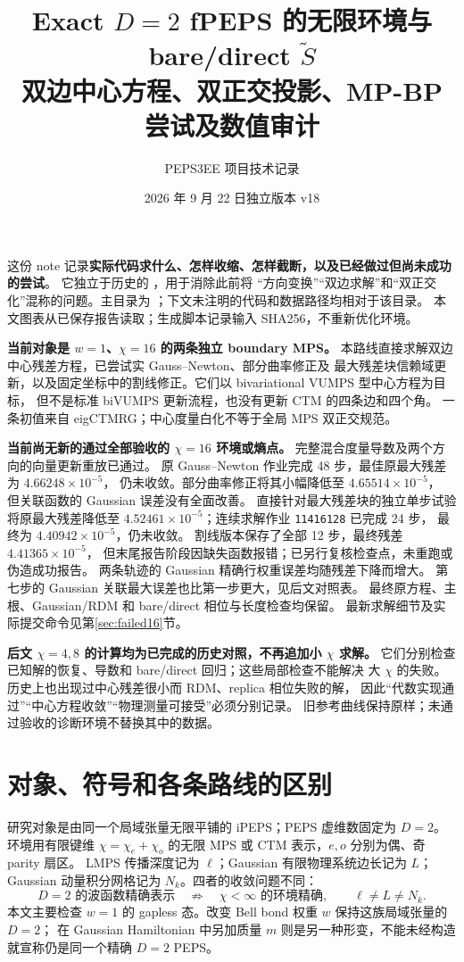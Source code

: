 \documentclass[11pt]{article}
\title{Exact $D=2$ fPEPS 的无限环境与 bare/direct $\widetilde S$\\
\large 双边中心方程、双正交投影、MP-BP 尝试及数值审计}
\author{PEPS3EE 项目技术记录}
\date{2026 年 9 月 22 日\quad 独立版本 v18}
\begin{document}
\maketitle

这份 note 记录\textbf{实际代码求什么、怎样收缩、怎样截断，以及已经做过但尚未成功的尝试}。
它独立于历史的 ，用于消除此前将
“方向变换”“双边求解”和“双正交化”混称的问题。主目录为
；下文未注明的代码和数据路径均相对于该目录。
本文图表从已保存报告读取；生成脚本记录输入 SHA256，不重新优化环境。

\textbf{当前对象是 $w=1$、$\chi=16$ 的两条独立 boundary MPS。}
本路线直接求解双边中心残差方程，已尝试实 Gauss--Newton、部分曲率修正及
最大残差块信赖域更新，以及固定坐标中的割线修正。它们以 bivariational VUMPS 型中心方程为目标，
但不是标准 biVUMPS 更新流程，也没有更新 CTM 的四条边和四个角。
一条初值来自 eigCTMRG；中心度量白化不等于全局 MPS 双正交规范。

\textbf{当前尚无新的通过全部验收的 $\chi=16$ 环境或熵点。}
完整混合度量导数及两个方向的向量更新重放已通过。
原 Gauss--Newton 作业完成 48 步，最佳原最大残差为 $4.66248\times10^{-5}$，
仍未收敛。部分曲率修正将其小幅降低至 $4.65514\times10^{-5}$，
但关联函数的 Gaussian 误差没有全面改善。
直接针对最大残差块的独立单步试验将原最大残差降低至
$4.52461\times10^{-5}$；连续求解作业 \texttt{11416128} 已完成 24 步，
最终为 $4.40942\times10^{-5}$，仍未收敛。
割线版本保存了全部 12 步，最终残差 $4.41365\times10^{-5}$，
但末尾报告阶段因缺失函数报错；已另行复核检查点，未重跑或伪造成功报告。
两条轨迹的 Gaussian 精确行权重误差均随残差下降而增大。
第七步的 Gaussian 关联最大误差也比第一步更大，见后文对照表。
最终原方程、主根、Gaussian/RDM 和 bare/direct 相位与长度检查均保留。
最新求解细节及实际提交命令见第\ref{sec:failed16}节。

\textbf{后文 $\chi=4,8$ 的计算均为已完成的历史对照，不再追加小 $\chi$ 求解。}
它们分别检查已知解的恢复、导数和 bare/direct 回归；这些局部检查不能解决
大 $\chi$ 的失败。历史上也出现过中心残差很小而 RDM、replica 相位失败的解，
因此“代数实现通过”“中心方程收敛”“物理测量可接受”必须分别记录。
旧参考曲线保持原样；未通过验收的诊断环境不替换其中的数据。

\tableofcontents
\newpage

\section{对象、符号和各条路线的区别}
\label{sec:scope}
研究对象是由同一个局域张量无限平铺的 iPEPS；PEPS 虚维数固定为 $D=2$。
环境用有限键维 $\chi=\chi_e+\chi_o$ 的无限 MPS 或 CTM 表示，$e,o$ 分别为偶、奇 parity 扇区。
LMPS 传播深度记为 $\ell$；Gaussian 有限物理系统边长记为 $L$；
Gaussian 动量积分网格记为 $N_k$。四者的收敛问题不同：
\begin{equation}
 D=2\text{ 的波函数精确表示}\quad\not\Rightarrow\quad
 \chi<\infty\text{ 的环境精确},\qquad \ell\ne L\ne N_k.
\end{equation}
本文主要检查 $w=1$ 的 gapless 态。改变 Bell bond 权重 $w$ 保持这族局域张量的 $D=2$；
在 Gaussian Hamiltonian 中另加质量 $m$ 则是另一种形变，不能未经构造就宣称仍是同一个精确 $D=2$ PEPS。
\end{document}
